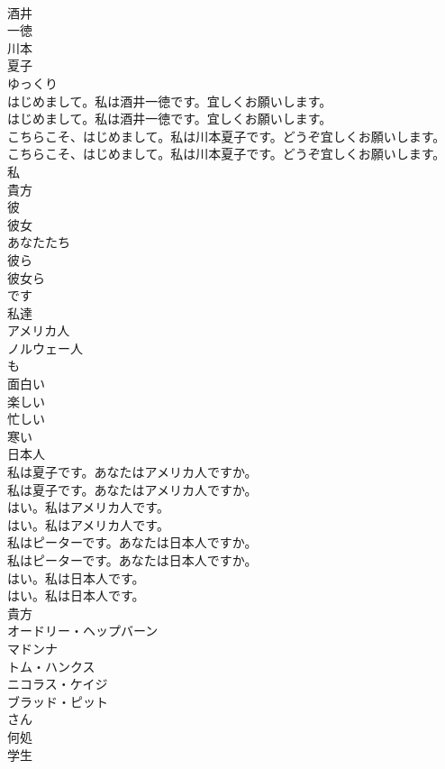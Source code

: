 \documentclass[8pt]{extreport}
\begin{document}
\begin{CJK}{UTF8}{min}
\\	酒井
\\	一徳
\\	川本
\\	夏子
\\	ゆっくり
\\	はじめまして。私は酒井一徳です。宜しくお願いします。	
\\	はじめまして。私は酒井一徳です。宜しくお願いします。 
\\	こちらこそ、はじめまして。私は川本夏子です。どうぞ宜しくお願いします。	
\\	こちらこそ、はじめまして。私は川本夏子です。どうぞ宜しくお願いします。 
\\	私
\\	貴方
\\	彼
\\	彼女
\\	あなたたち
\\	彼ら
\\	彼女ら
\\	です
\\	私達
\\	アメリカ人
\\	ノルウェー人
\\	も
\\	面白い
\\	楽しい
\\	忙しい
\\	寒い
\\	日本人
\\	私は夏子です。あなたはアメリカ人ですか。	
\\	私は夏子です。あなたはアメリカ人ですか。 
\\	はい。私はアメリカ人です。	
\\	はい。私はアメリカ人です。 
\\	私はピーターです。あなたは日本人ですか。	
\\	私はピーターです。あなたは日本人ですか。 
\\	はい。私は日本人です。	
\\	はい。私は日本人です。 
\\	貴方
\\	オードリー・ヘップバーン
\\	マドンナ
\\	トム・ハンクス
\\	ニコラス・ケイジ
\\	ブラッド・ピット
\\	さん
\\	何処
\\	学生

\end{CJK}
\end{document}

